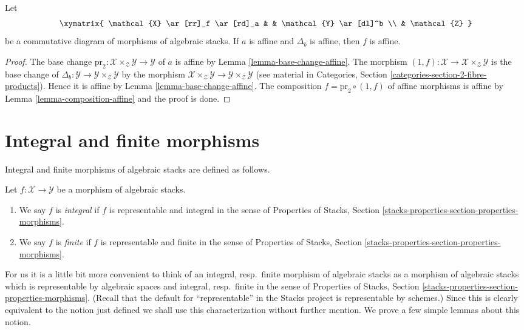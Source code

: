 \begin{lemma}
\label{lemma-affine-permanence}
Let
$$
\xymatrix{
\mathcal{X} \ar[rr]_f \ar[rd]_a & & \mathcal{Y} \ar[dl]^b \\
& \mathcal{Z}
}
$$
be a commutative diagram of morphisms of algebraic stacks.
If $a$ is affine and $\Delta_b$ is affine, then
$f$ is affine.
\end{lemma}

\begin{proof}
The base change
$\text{pr}_2 : \mathcal{X} \times_\mathcal{Z} \mathcal{Y} \to \mathcal{Y}$
of $a$ is affine by Lemma \ref{lemma-base-change-affine}. The morphism
$(1, f) : \mathcal{X} \to \mathcal{X} \times_\mathcal{Z} \mathcal{Y}$
is the base change of
$\Delta_b : \mathcal{Y} \to \mathcal{Y} \times_\mathcal{Z} \mathcal{Y}$
by the morphism $\mathcal{X} \times_\mathcal{Z} \mathcal{Y} \to
\mathcal{Y} \times_\mathcal{Z} \mathcal{Y}$ (see material in
Categories, Section \ref{categories-section-2-fibre-products}).
Hence it is affine by
Lemma \ref{lemma-base-change-affine}.
The composition $f = \text{pr}_2 \circ (1, f)$ of affine morphisms is affine by
Lemma \ref{lemma-composition-affine} and the proof is done.
\end{proof}





\section{Integral and finite morphisms}
\label{section-integral}

\noindent
Integral and finite morphisms of algebraic stacks are defined as follows.

\begin{definition}
\label{definition-integral}
Let $f : \mathcal{X} \to \mathcal{Y}$ be a morphism of algebraic stacks.
\begin{enumerate}
\item We say $f$ is {\it integral} if $f$ is representable and integral
in the sense of Properties of Stacks, Section
\ref{stacks-properties-section-properties-morphisms}.
\item We say $f$ is {\it finite} if $f$ is representable and finite
in the sense of Properties of Stacks, Section
\ref{stacks-properties-section-properties-morphisms}.
\end{enumerate}
\end{definition}

\noindent
For us it is a little bit more convenient to think of an
integral, resp.\ finite morphism of algebraic stacks as a
morphism of algebraic stacks which is
representable by algebraic spaces and integral, resp.\ finite
in the sense of Properties of Stacks, Section
\ref{stacks-properties-section-properties-morphisms}.
(Recall that the default for ``representable'' in the Stacks project
is representable by schemes.)
Since this is clearly equivalent to the notion just defined we shall
use this characterization without further mention.
We prove a few simple lemmas about this notion.

